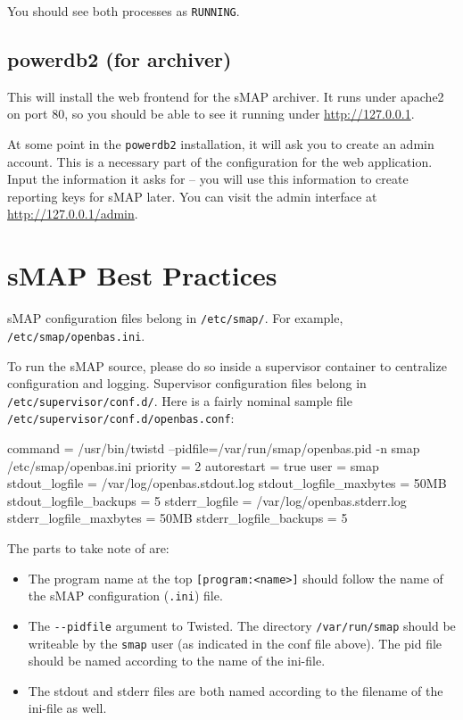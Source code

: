 \documentclass[11pt]{article}
\begin{document}
You should see both processes as \verb`RUNNING`.

\subsection{powerdb2 (for archiver)}


This will install the web frontend for the sMAP archiver. It runs under apache2 on port 80, so you should be able to see it running under \url{http://127.0.0.1}.

\bigskip

At some point in the \verb`powerdb2` installation, it will ask you to create an admin account. This is a necessary part of the configuration for the web application. Input the information it asks for -- you will use this information
to create reporting keys for sMAP later. You can visit the admin interface at \url{http://127.0.0.1/admin}.

\section{sMAP Best Practices}

sMAP configuration files belong in \verb`/etc/smap/`. For example, \verb`/etc/smap/openbas.ini`.

\bigskip

To run the sMAP source, please do so inside a supervisor container to centralize configuration and logging. Supervisor configuration files belong in \verb`/etc/supervisor/conf.d/`. Here is a fairly nominal sample file \verb`/etc/supervisor/conf.d/openbas.conf`:

\begin{shell-sessioncode}
command = /usr/bin/twistd --pidfile=/var/run/smap/openbas.pid -n smap /etc/smap/openbas.ini
priority = 2
autorestart = true
user = smap
stdout_logfile = /var/log/openbas.stdout.log
stdout_logfile_maxbytes = 50MB
stdout_logfile_backups = 5
stderr_logfile = /var/log/openbas.stderr.log
stderr_logfile_maxbytes = 50MB
stderr_logfile_backups = 5
\end{shell-sessioncode}

The parts to take note of are:

\begin{itemize}
	\item The program name at the top \verb`[program:<name>]` should follow the name of the sMAP configuration (\verb`.ini`) file.
	\item The \verb`--pidfile` argument to Twisted. The directory \verb`/var/run/smap` should be writeable by the \verb`smap` user (as indicated in the conf file above). The pid file should be named according to the name of the ini-file.
	\item The stdout and stderr files are both named according to the filename of the ini-file as well.
\end{itemize}
\end{document}

